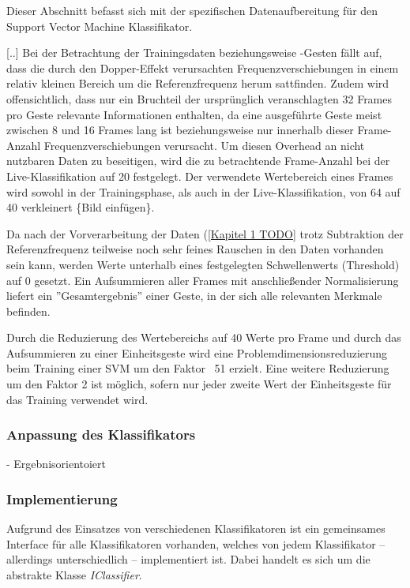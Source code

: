 Dieser Abschnitt befasst sich mit der spezifischen Datenaufbereitung für den Support Vector Machine Klassifikator.

[..]
Bei der Betrachtung der Trainingsdaten beziehungsweise -Gesten fällt auf, dass die durch den Dopper-Effekt verursachten Frequenzverschiebungen in einem relativ kleinen Bereich um die Referenzfrequenz herum sattfinden.
Zudem wird offensichtlich, dass nur ein Bruchteil der ursprünglich veranschlagten 32 Frames pro Geste relevante Informationen enthalten, da eine ausgeführte Geste meist zwischen 8 und 16 Frames lang ist beziehungsweise nur innerhalb dieser Frame-Anzahl Frequenzverschiebungen verursacht.
Um diesen Overhead an nicht nutzbaren Daten zu beseitigen, wird die zu betrachtende Frame-Anzahl bei der Live-Klassifikation auf 20 festgelegt.
Der verwendete Wertebereich eines Frames wird sowohl in der Trainingsphase, als auch in der Live-Klassifikation, von 64 auf 40 verkleinert \{Bild einfügen\}. 

Da nach der Vorverarbeitung der Daten (\ref{Kapitel 1 TODO} trotz Subtraktion der Referenzfrequenz teilweise noch sehr feines Rauschen in den Daten vorhanden sein kann, werden Werte unterhalb eines festgelegten Schwellenwerts (Threshold) auf 0 gesetzt.
Ein Aufsummieren aller Frames mit anschließender Normalisierung liefert ein ''Gesamtergebnis'' einer Geste, in der sich alle relevanten Merkmale befinden.

Durch die Reduzierung des Wertebereichs auf 40 Werte pro Frame und durch das Aufsummieren zu einer Einheitsgeste wird eine Problemdimensionsreduzierung beim Training einer SVM um den Faktor ~51 erzielt.
Eine weitere Reduzierung um den Faktor 2 ist möglich, sofern nur jeder zweite Wert der Einheitsgeste für das Training verwendet wird.


\subsubsection{Anpassung des Klassifikators}
- Ergebnisorientoiert

\subsubsection{Implementierung}
Aufgrund des Einsatzes von verschiedenen Klassifikatoren ist ein gemeinsames Interface für alle Klassifikatoren vorhanden, welches von jedem Klassifikator -- allerdings unterschiedlich -- implementiert ist. 
Dabei handelt es sich um die abstrakte Klasse \textit{IClassifier}.

